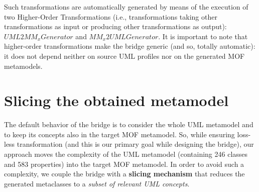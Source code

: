 Such transformations are automatically generated by means of the execution of two Higher-Order Transformations
(i.e., transformations taking other transformations as input or producing
other transformations as output): $UML2MM_xGenerator$ and $MM_x2UMLGenerator$. It is important to note that higher-order transformations make the bridge generic (and so, totally automatic): it does not depend neither on source UML profiles nor on the generated MOF metamodels.


\section{Slicing the obtained metamodel}\label{sec:slicing}

The default behavior of the bridge is to consider the whole UML metamodel and to keep its concepts also in the
target MOF metamodel. So, while ensuring loss-less transformation (and this is our primary goal while designing the bridge), our 
approach moves the complexity of the UML metamodel (containing 246 classes and 583 properties)
into the target MOF metamodel. In order to avoid such a complexity, we couple the bridge with a \textbf{slicing mechanism} that reduces the generated metaclasses to a \textit{subset of relevant UML concepts}.


